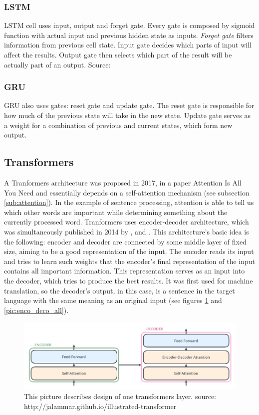 \subsubsection*{LSTM} LSTM cell uses input, output and forget gate. Every gate is composed by sigmoid function with actual input and previous hidden state as inputs.
\textit{Forget gate} filters information from previous cell state. Input gate decides which parts of input will affect the results. Output gate then selects which part of the result will be actually part of an output. Source: \textit{\citep{rnn_paper}}
\subsubsection*{GRU}
GRU also uses gates: reset gate and update gate.
The reset gate is responsible for how much of the previous state will take in the new state. Update gate serves as a weight for a combination of previous and current states, which form new output.

\subsection{Transformers}
\label{sub:transformers}
A Tranformers architecture was proposed in 2017, in a paper Attention Is All You Need \citep{Vaswani2017} and essentially depends on a self-attention mechanism (see subsection \ref{sub:attention}). In the example of sentence processing, attention is able to tell us which other words are important while determining something about the currently processed word. Tranformers uses encoder-decoder architecture, which was simultaneously published in 2014 by \citep{Cho2014}, \citep{Sutskever2014} and \citep{Wu2016}. This architecture's basic idea is the following: encoder and decoder are connected by some middle layer of fixed size, aiming to be a good representation of the input. The encoder reads its input and tries to learn such weights that the encoder's final representation of the input contains all important information. This representation serves as an input into the decoder, which tries to produce the best results. It was first used for machine translation, so the decoder's output, in this case, is a sentence in the target language with the same meaning as an original input (see figures \ref{pic:enco_deco}  and \ref{pic:enco_deco_all}).
\begin{figure}[h]
\centering
\includegraphics[width=1\columnwidth]{../img/encoder_decoder}
\protect\caption{This picture describes design of one transformers layer. source: http://jalammar.github.io/illustrated-transformer }
\label{pic:enco_deco}
\end{figure}

